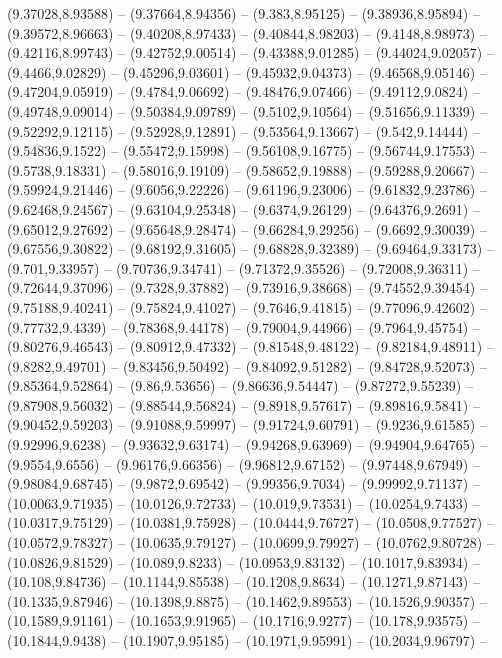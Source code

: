 {(9.37028,8.93588) -- (9.37664,8.94356) -- (9.383,8.95125) -- (9.38936,8.95894) -- (9.39572,8.96663) -- (9.40208,8.97433) -- (9.40844,8.98203) -- (9.4148,8.98973) -- (9.42116,8.99743) -- (9.42752,9.00514) -- (9.43388,9.01285) -- (9.44024,9.02057) --
(9.4466,9.02829) -- (9.45296,9.03601) -- (9.45932,9.04373) -- (9.46568,9.05146) -- (9.47204,9.05919) -- (9.4784,9.06692) -- (9.48476,9.07466) -- (9.49112,9.0824) -- (9.49748,9.09014) -- (9.50384,9.09789) -- (9.5102,9.10564) -- (9.51656,9.11339) --
(9.52292,9.12115) -- (9.52928,9.12891) -- (9.53564,9.13667) -- (9.542,9.14444) -- (9.54836,9.1522) -- (9.55472,9.15998) -- (9.56108,9.16775) -- (9.56744,9.17553) -- (9.5738,9.18331) -- (9.58016,9.19109) -- (9.58652,9.19888) -- (9.59288,9.20667) --
(9.59924,9.21446) -- (9.6056,9.22226) -- (9.61196,9.23006) -- (9.61832,9.23786) -- (9.62468,9.24567) -- (9.63104,9.25348) -- (9.6374,9.26129) -- (9.64376,9.2691) -- (9.65012,9.27692) -- (9.65648,9.28474) -- (9.66284,9.29256) -- (9.6692,9.30039) --
(9.67556,9.30822) -- (9.68192,9.31605) -- (9.68828,9.32389) -- (9.69464,9.33173) -- (9.701,9.33957) -- (9.70736,9.34741) -- (9.71372,9.35526) -- (9.72008,9.36311) -- (9.72644,9.37096) -- (9.7328,9.37882) -- (9.73916,9.38668) -- (9.74552,9.39454) --
(9.75188,9.40241) -- (9.75824,9.41027) -- (9.7646,9.41815) -- (9.77096,9.42602) -- (9.77732,9.4339) -- (9.78368,9.44178) -- (9.79004,9.44966) -- (9.7964,9.45754) -- (9.80276,9.46543) -- (9.80912,9.47332) -- (9.81548,9.48122) -- (9.82184,9.48911) --
(9.8282,9.49701) -- (9.83456,9.50492) -- (9.84092,9.51282) -- (9.84728,9.52073) -- (9.85364,9.52864) -- (9.86,9.53656) -- (9.86636,9.54447) -- (9.87272,9.55239) -- (9.87908,9.56032) -- (9.88544,9.56824) -- (9.8918,9.57617) -- (9.89816,9.5841) --
(9.90452,9.59203) -- (9.91088,9.59997) -- (9.91724,9.60791) -- (9.9236,9.61585) -- (9.92996,9.6238) -- (9.93632,9.63174) -- (9.94268,9.63969) -- (9.94904,9.64765) -- (9.9554,9.6556) -- (9.96176,9.66356) -- (9.96812,9.67152) -- (9.97448,9.67949) --
(9.98084,9.68745) -- (9.9872,9.69542) -- (9.99356,9.7034) -- (9.99992,9.71137) -- (10.0063,9.71935) -- (10.0126,9.72733) -- (10.019,9.73531) -- (10.0254,9.7433) -- (10.0317,9.75129) -- (10.0381,9.75928) -- (10.0444,9.76727) -- (10.0508,9.77527) --
(10.0572,9.78327) -- (10.0635,9.79127) -- (10.0699,9.79927) -- (10.0762,9.80728) -- (10.0826,9.81529) -- (10.089,9.8233) -- (10.0953,9.83132) -- (10.1017,9.83934) -- (10.108,9.84736) -- (10.1144,9.85538) -- (10.1208,9.8634) -- (10.1271,9.87143) --
(10.1335,9.87946) -- (10.1398,9.8875) -- (10.1462,9.89553) -- (10.1526,9.90357) -- (10.1589,9.91161) -- (10.1653,9.91965) -- (10.1716,9.9277) -- (10.178,9.93575) -- (10.1844,9.9438) -- (10.1907,9.95185) -- (10.1971,9.95991) -- (10.2034,9.96797) --
}
